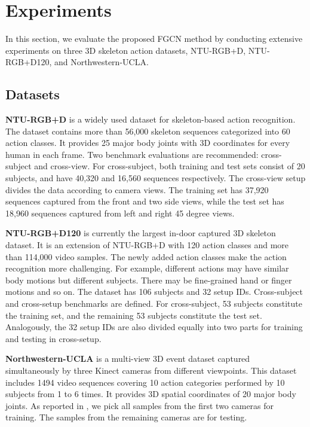 \documentclass[runningheads]{llncs}
\begin{document}
\vspace{-1mm}
\section{Experiments}
\vspace{-1mm}
In this section, we evaluate the proposed FGCN method by conducting extensive experiments on three 3D skeleton action datasets, NTU-RGB+D, NTU-RGB+D120, and Northwestern-UCLA.


\vspace{-1mm}
\subsection{Datasets}

\hspace{5mm}\textbf{NTU-RGB+D} \cite{shahroudy2016ntu} is a widely used dataset for skeleton-based action recognition. The dataset contains more than 56,000 skeleton sequences categorized into 60 action classes. It provides 25 major body joints with 3D coordinates for every human in each frame. Two benchmark evaluations are recommended: cross-subject and cross-view. For cross-subject, both training and test sets consist of 20 subjects, and have 40,320 and 16,560 sequences respectively. The cross-view setup divides the data according to camera views. The training set has 37,920 sequences captured from the front and two side views, while the test set has 18,960 sequences captured from left and right 45 degree views.

\textbf{NTU-RGB+D120} \cite{liu2019ntu} is currently the largest in-door captured 3D skeleton dataset. It is an extension of NTU-RGB+D with 120 action classes and more than 114,000 video samples. The newly added action classes make the action recognition more challenging. For example, different actions may have similar body motions but different subjects. There may be fine-grained hand or finger motions and so on. The dataset has 106 subjects and 32 setup IDs. Cross-subject and cross-setup benchmarks are defined. For cross-subject, 53 subjects constitute the training set, and the remaining 53 subjects constitute the test set. Analogously, the 32 setup IDs are also divided equally into two parts for training and testing in cross-setup.



\textbf{Northwestern-UCLA} \cite{wang2014cross} is a multi-view 3D event dataset captured simultaneously by three Kinect cameras from different viewpoints. This dataset includes 1494 video sequences covering 10 action categories performed by 10 subjects from 1 to 6 times. It provides 3D spatial coordinates of 20 major body joints. As reported in \cite{wang2014cross}, we pick all samples from the first two cameras for training. The samples from the remaining cameras are for testing.
\end{document}
